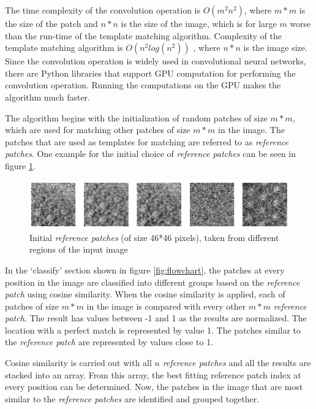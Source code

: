 \documentclass[fleqn,10pt]{wlscirep}
\begin{document}
	
	The time complexity of the convolution operation is $O(m^2n^2)$, where $m*m$ is the size of the patch and $n*n$ is the size of the image, which is for large $m$ worse than the run-time of the template matching algorithm. Complexity of the template matching algorithm is $O(n^2log(n^2))$ \cite{template_matching}, where $n*n$ is the image size. Since the convolution operation is widely used in convolutional neural networks, there are Python libraries that support GPU computation for performing the convolution operation. Running the computations on the GPU makes the algorithm much faster.
	
	The algorithm begins with the initialization of random patches of size $m*m$, which are used for matching other patches of size $m*m$ in the image. The patches that are used as templates for matching are referred to as \textit{reference patches}. One example for the initial choice of \textit{reference patches} can be seen in figure \ref{fig:initial_reference_patches}. 
	
	\begin{figure}
		\centering
		\includegraphics[scale=0.75]{./imgs/initial_reference_patches.png}
		\caption[Initial \textit{reference patches}]{Initial \textit{reference patches} (of size 46*46 pixels), taken from different regions of the input image}
		\label{fig:initial_reference_patches}
	\end{figure} 
	
	In the `classify'  section shown in figure \ref{fig:flowchart}, the patches at every position in the image are classified into different groups based on the \textit{reference patch} using cosine similarity. When the cosine similarity is applied, each of patches of size $m*m$ in the image is compared with every other $m*m$ \textit{reference patch}. The result has values between -1 and 1 as the results are normalized. The location with a perfect match is represented by value 1. The patches similar to the \textit{reference patch} are represented by values close to 1. 
	
	Cosine similarity is carried out with all $n$ \textit{reference patches} and all the results are stacked into an array. From this array, the best fitting reference patch index at every position can be determined. Now, the patches in the image that are most similar to the \textit{reference patches} are identified and grouped together.   
	
\end{document}
